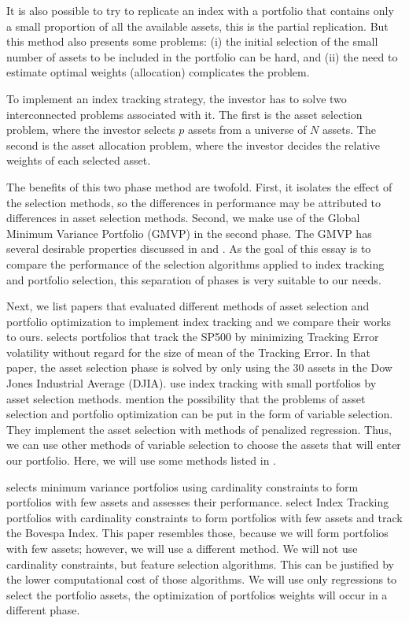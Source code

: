 \documentclass[12pt,oneside,a4paper]{memoir}
\begin{document}
It is also possible to try to replicate an index with a portfolio that contains only a small proportion of all the available assets, this is the partial replication.
But this method also presents some problems:
(i) the initial selection of the small number of assets to be included in the portfolio can be hard, and
(ii) the need to estimate optimal weights (allocation) complicates the problem.

To implement an index tracking strategy, the investor has to solve two interconnected problems associated with it.
The first is the asset selection problem, where the investor selects $p$ assets from a universe of $N$ assets.
The second is the asset allocation problem, where the investor decides the relative weights of each selected asset.

The benefits of this two phase method are twofold.
First, it isolates the effect of the selection methods, so the differences in performance may be attributed to differences in asset selection methods.
Second, we make use of the Global Minimum Variance Portfolio (GMVP) in the second phase.
The GMVP has several desirable properties discussed in  and .
As the goal of this essay is to compare the performance of the selection algorithms applied to index tracking and portfolio selection, this separation of phases is very suitable to our needs.

Next, we list papers that evaluated different methods of asset selection and portfolio optimization to implement index tracking and we compare their works to ours.
%
 selects portfolios that track the SP500 by minimizing Tracking Error volatility without regard for the size of mean of the Tracking Error.
In that paper, the asset selection phase is solved by only using the 30 assets in the Dow Jones Industrial Average (DJIA).
 use index tracking with small portfolios by asset selection methods.
 mention the possibility that the problems of asset selection and portfolio optimization can be put in the form of variable selection.
They implement the asset selection with methods of penalized regression.
Thus, we can use other methods of variable selection to choose the assets that will enter our portfolio.
Here, we will use some methods listed in .

 selects minimum variance portfolios using cardinality constraints to form portfolios with few assets and assesses their performance.
 select Index Tracking portfolios with cardinality constraints to form portfolios with few assets and track the Bovespa Index.
This paper resembles those, because we will form portfolios with few assets; however, we will use a different method.
We will not use cardinality constraints, but feature selection algorithms.
This can be justified by the lower computational cost of those algorithms.
We will use only regressions to select the portfolio assets, the optimization of portfolios weights will occur in a different phase.
\end{document}
